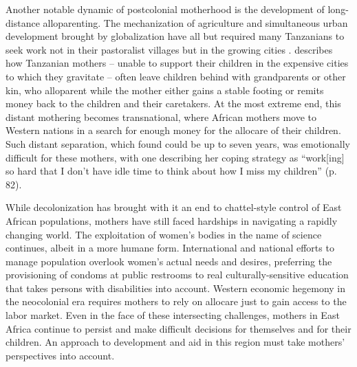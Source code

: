 \documentclass{../../../coursework}
\begin{document}
Another notable dynamic of postcolonial motherhood is the development of
long-distance alloparenting. The mechanization of agriculture and simultaneous
urban development brought by globalization have all but required many
Tanzanians to seek work not in their pastoralist villages but in the growing
cities \parencite{Coc19}. \textcite{Kyo15} describes how Tanzanian mothers --
unable to support their children in the expensive cities to which they
gravitate -- often leave children behind with grandparents or other kin, who
alloparent while the mother either gains a stable footing or remits money back
to the children and their caretakers. At the most extreme end, this distant
mothering becomes transnational, where African mothers move to Western nations
in a search for enough money for the allocare of their children. Such distant
separation, which \textcite{Kyo15} found could be up to seven years, was
emotionally difficult for these mothers, with one describing her coping
strategy as ``work[ing] so hard that I don't have idle time to think about how
I miss my children'' (p. 82).

While decolonization has brought with it an end to chattel-style control of
East African populations, mothers have still faced hardships in navigating a
rapidly changing world. The exploitation of women's bodies in the name of
science continues, albeit in a more humane form. International and national
efforts to manage population overlook women's actual needs and desires,
preferring the provisioning of condoms at public restrooms to real
culturally-sensitive education that takes persons with disabilities into
account. Western economic hegemony in the neocolonial era requires mothers to
rely on allocare just to gain access to the labor market. Even in the face of
these intersecting challenges, mothers in East Africa continue to persist and
make difficult decisions for themselves and for their children. An approach to
development and aid in this region must take mothers' perspectives into
account.

\printbibliography
\end{document}
